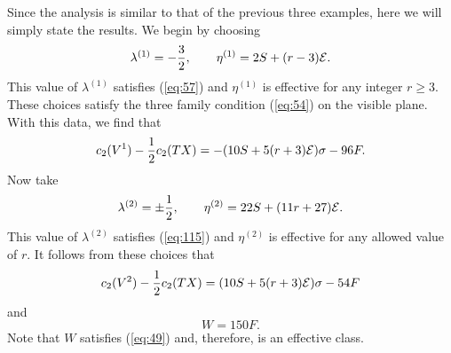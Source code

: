 \documentclass[a4paper,12pt]{article}
\numberwithin{equation}{section}
\theoremstyle{plain}
\begin{document}
Since the analysis is similar to that of the previous three examples, here we
will simply state the results. We begin by choosing
%
\begin{equation}
\lambda^{(1)}=-\frac{3}{2}, \qquad \eta^{(1)}=2S+(r-3){\cal{E}}.
\label{eq:116}
\end{equation}
%
This value of $\lambda^{(1)}$ satisfies (\ref{eq:57}) and $\eta^{(1)}$ is
effective for any integer $r\geq3$. These choices satisfy the three family
condition (\ref{eq:54}) on the visible plane. With this data, we find that
%
\begin{equation}
c_{2}(V^{1})-\frac{1}{2}c_{2}(TX)=-(10S+5(r+3){\cal{E}})\sigma-96F.
\label{eq:117}
\end{equation}
%
Now take
\begin{equation}
\lambda^{(2)}=\pm\frac{1}{2}, \qquad \eta^{(2)}=22S+(11r+27){\cal{E}}.
\label{eq:118}
\end{equation}
%
This value of $\lambda^{(2)}$ satisfies (\ref{eq:115}) and $\eta^{(2)}$ is
effective for any allowed value of $r$. It follows from these choices that
%
\begin{equation}
c_{2}(V^{2})-\frac{1}{2}c_{2}(TX)=(10S+5(r+3){\cal{E}})\sigma-54F
\label{eq:119}
\end{equation}
%
and
%
\begin{equation}
W=150F.
\label{eq:120}
\end{equation}
%
Note that $W$ satisfies (\ref{eq:49}) and, therefore, is an effective class.
\end{document}
